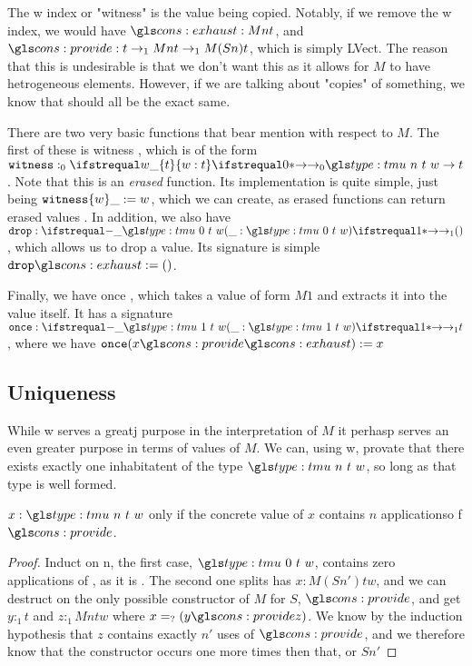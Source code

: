 The \ident w index or "witness" is the value being copied.
Notably, if we remove the \ident w index, we would have $\mz : M n t$, and $\ms : t \to_1 M n t \to_1 M (S n) t$, which is simply \ident LVect. 
The reason that this is undesirable is that we don't want this as it allows for $M$ to have hetrogeneous elements. 
However, if we are talking about "copies" of something, we know that should all be the exact same.

There are two very basic functions that bear mention with respect to $M$. The first of these is \ident witness , which is of the form $\ident witness :_0 \fa0 w : t . \tm n t w \to t$.
Note that this is an \emph{erased} function.
Its implementation is quite simple, just being $\ident witness \{w\} \_ \deq w$, which we can create, as erased functions can return erased values \needcite.
In addition, we also have $\ident drop : \fn1 \_ : {\tm 0 t w} . ()$, which allows us to drop a value.
Its signature is simple $\ident drop \mz \deq ()$.

Finally, we have \ident once , which takes a value of form $M 1$ and extracts it into the value itself.
It has a signature $\ident once : \fn1 \_ : \tm 1 t w . t$, where we have $\ident once (x \ms \mz) \deq x$

\subsection{Uniqueness}

While \ident w serves a greatj purpose in the interpretation of $M$ it perhasp serves an even greater purpose in terms of values of $M$.
We can, using \sigil w, provate that there exists exactly one inhabitatent of the type $\tm n t w$, so long as that type is well formed.


\begin{lemma}
	$x : \tm n t w$ only if the concrete value of $x$ contains $n$ applicationso f $\ms$.
\end{lemma}
\begin{proof}
	Induct on \sigil n, the first case, $\tm 0 t w$, contains zero applications of \ms, as it is \mz.
	The second one splits has $x : M (S n') t w$, and we can destruct on the only possible constructor of $M$ for $S$, $\ms$, and get $y :_1 t$ and $z :_1 M n t w$ where $x \peq (y \ms z)$. 
	We know by the induction hypothesis that $z$ contains exactly $n'$ uses of $\ms$, and we therefore know that the constructor occurs one more times then that, or $S n'$
\end{proof}

